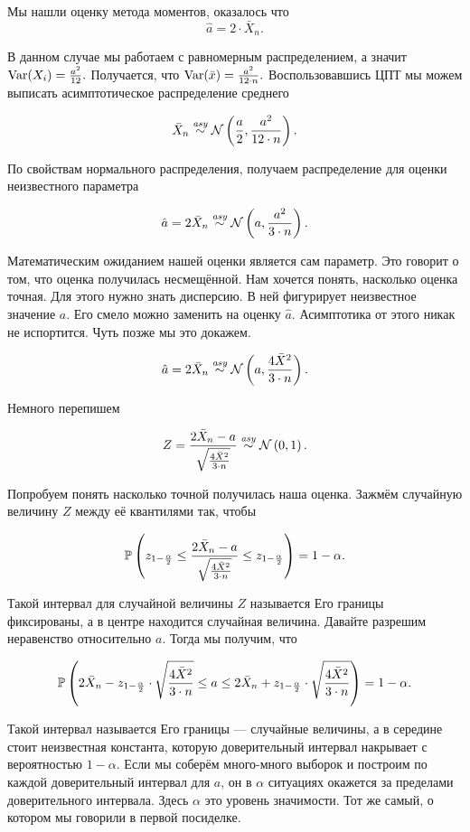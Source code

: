 \documentclass[12pt, a4paper, oneside]{article}
\begin{document}
\begin{sol}
Мы нашли оценку метода моментов, оказалось что 
\[ \hat{a} = 2 \cdot \bar{X}_{n}. \]

В данном случае мы работаем с равномерным распределением, а значит $\operatorname{Var}(X_i) = \frac{a^2}{12}.$ Получается, что $\operatorname{Var}(\bar x) = \frac{a^2}{12 \cdot n}.$ Воспользовавшись ЦПТ мы можем выписать асимптотическое распределение среднего 

\[\bar{X}_n \overset{\text{\textit{asy}}}{\sim} \mathcal{N} \left(\frac{a}{2}, \frac{a^2}{12 \cdot n} \right).\] 

По свойствам нормального распределения, получаем распределение для оценки неизвестного параметра

\[\hat{a}= 2 \bar{X}_{n} \overset{\text{\textit{asy}}}{\sim} \mathcal{N} \left(a, \frac{a^2}{3 \cdot n} \right).\] 

Математическим ожиданием нашей оценки является сам параметр. Это говорит о том, что оценка получилась несмещённой. Нам хочется понять, насколько оценка точная. Для этого нужно знать дисперсию. В ней фигурирует неизвестное значение $a$. Его смело можно заменить на оценку $\hat{a}$. Асимптотика от этого никак не испортится. Чуть позже мы это докажем. 

\[\hat{a}= 2 \bar{X}_{n} \overset{\text{\textit{asy}}}{\sim} \mathcal{N} \left(a, \frac{4 \bar{X}^2}{3 \cdot n} \right).\] 

Немного перепишем 

\[Z = \frac{ 2 \bar{X}_{n} - a}{\sqrt{\frac{4 \bar{X}^2}{3 \cdot n}} } \overset{\text{\textit{asy}}}{\sim} \mathcal{N} \left(0, 1 \right).\] 

Попробуем понять насколько точной получилась наша оценка. Зажмём случайную величину $Z$ между её квантилями так, чтобы 

$$
\mathbb{P} \left( z_{1 - \frac{\alpha}{2}} \le \frac{ 2 \bar{X}_{n} - a}{\sqrt{\frac{4 \bar{X}^2}{3 \cdot n}} } \le z_{1 - \frac{\alpha}{2}} \right) = 1 - \alpha.
$$

Такой интервал для случайной величины $Z$ называется  Его границы фиксированы, а в центре находится случайная величина. Давайте разрешим неравенство относительно $a$. Тогда мы получим, что

$$
\mathbb{P}\left(2 \bar{X}_{n}  - z_{1 - \frac{\alpha}{2}} \cdot \sqrt{\frac{4 \bar{X}^2}{3 \cdot n}}  \le a \le 2 \bar{X}_{n}  + z_{1 - \frac{\alpha}{2}} \cdot \sqrt{\frac{4 \bar{X}^2}{3 \cdot n}} \right) = 1 - \alpha.
$$

Такой интервал называется  Его границы --- случайные величины, а в середине стоит неизвестная константа, которую доверительный интервал накрывает с вероятностью $1 - \alpha$. Если мы соберём много-много выборок и построим по каждой доверительный интервал для $a$, он в $\alpha$ ситуациях окажется за пределами доверительного интервала. Здесь $\alpha$ это уровень значимости. Тот же самый, о котором мы говорили в первой посиделке. 



\end{sol}
\end{document}
